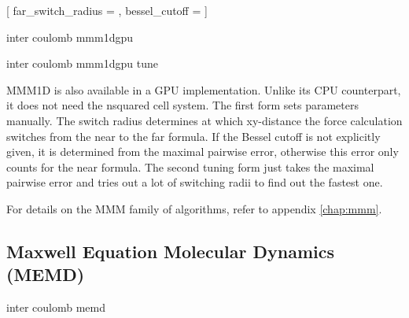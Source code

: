 \begin{pysyntax}
	[
		far_switch_radius = ,
		bessel_cutoff = 
	]
	\begin{features}
		  
	\end{features}
\end{pysyntax}
\begin{essyntax}
  inter coulomb  mmm1dgpu 
   

  inter coulomb  mmm1dgpu tune 
  \begin{features}
	\required{ELECTROSTATICS}
	\required{PARTIAL_PERIODIC}
	\required{MMM1D_GPU}
  \end{features}
\end{essyntax}
MMM1D is also available in a GPU implementation. Unlike its CPU
counterpart, it  does not need the nsquared cell system. The first
form sets parameters manually. The switch radius determines at which
xy-distance the force calculation switches from the near to the far
formula. If the Bessel cutoff is not explicitly given, it is
determined from the maximal pairwise error, otherwise this error only
counts for the near formula. The second tuning form just takes the
maximal pairwise error and tries out a lot of switching radii to find
out the fastest one.

For details on the MMM family of algorithms, refer to appendix
\vref{chap:mmm}.

\subsection{Maxwell Equation Molecular Dynamics (MEMD)}

\begin{essyntax}
  inter coulomb 
  memd   
  \begin{features}
  \end{features}
\end{essyntax}

